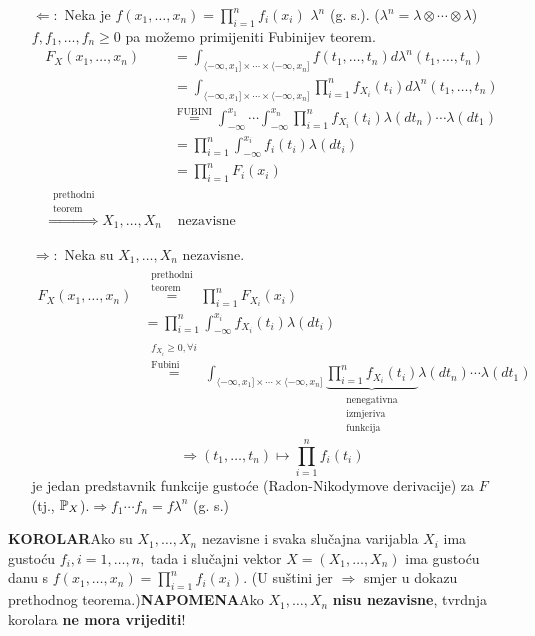 \documentclass{article}
\begin{document}
\begin{itemize}
    \item[\(\boxed{\Leftarrow}:\)] Neka je \(\displaystyle f(x_1,\ldots,x_n)=\prod_{i=1}^nf_i(x_i)\) \(\lambda^n\) (g. s.). (\(\lambda^n=\lambda\otimes\cdots\otimes\lambda\)) \(f,f_1,\ldots,f_n\ge 0\) pa možemo primijeniti Fubinijev teorem. \[\begin{aligned}F_X(x_1,\ldots,x_n)&=\int_{\langle-\infty,x_1]\times\cdots\times\langle-\infty,x_n]}f(t_1,\ldots,t_n)d\lambda^n(t_1,\ldots,t_n)\\&=\int_{\langle-\infty,x_1]\times\cdots\times\langle-\infty,x_n]}\prod_{i=1}^nf_{X_i}(t_i)d\lambda^n(t_1,\ldots,t_n)\\&\overset{\text{FUBINI}}{=}\int_{-\infty}^{x_1}\cdots\int_{-\infty}^{x_n}\prod_{i=1}^nf_{X_i}(t_i)\lambda(dt_n)\cdots \lambda(dt_1)\\&=\prod_{i=1}^n\int_{-\infty}^{x_i}f_i(t_i)\lambda(dt_i)\\&=\prod_{i=1}^nF_i(x_i)\\\overset{\substack{\text{prethodni}\\\text{teorem}}}{\Rightarrow}X_1,\ldots,X_n&\text{ nezavisne}\end{aligned}\] 
    \item[\(\boxed{\Rightarrow}:\)] Neka su \(X_1,\ldots,X_n\) nezavisne. \[\begin{aligned}F_X(x_1,\ldots,x_n)&\overset{\substack{\text{prethodni}\\\text{teorem}}}{=}\prod_{i=1}^nF_{X_i}(x_i)\\&=\prod_{i=1}^n\int_{-\infty}^{x_i}f_{X_i}(t_i)\lambda(dt_i)\\&\overset{\substack{f_{X_i}\ge 0,\forall i\\\text{Fubini}}}{=}\int_{\langle-\infty,x_1]\times\cdots\times\langle-\infty,x_n]}\underbrace{\prod_{i=1}^nf_{X_i}(t_i)}_{\substack{\text{nenegativna}\\\text{izmjeriva}\\\text{funkcija}}}\lambda (dt_n)\cdots \lambda(dt_1)\end{aligned}\]\[\Rightarrow (t_1,\ldots,t_n)\mapsto\prod_{i=1}^nf_i(t_i)\] je jedan predstavnik funkcije gustoće (Radon-Nikodymove derivacije) za \(F\) (tj., \(\Bbb P_X\)).\newline \(\Rightarrow f_1\cdots f_n=f\lambda^n\) (g. s.)
\end{itemize}
\textbf{KOROLAR}\newline Ako su \(X_1,\ldots,X_n\) nezavisne i svaka slučajna varijabla \(X_i\) ima gustoću \(f_i,i=1,\ldots,n,\) tada i slučajni vektor \(X=(X_1,\ldots,X_n)\) ima gustoću danu s \(f(x_1,\ldots,x_n)=\prod_{i=1}^nf_i(x_i).\) (U suštini jer \(\Rightarrow\) smjer u dokazu prethodnog teorema.)\newline\newline{}\textbf{NAPOMENA}\newline Ako \(X_1,\ldots,X_n\) \textbf{nisu nezavisne}, tvrdnja korolara \textbf{ne mora vrijediti}!\newline\newline
\end{document}

